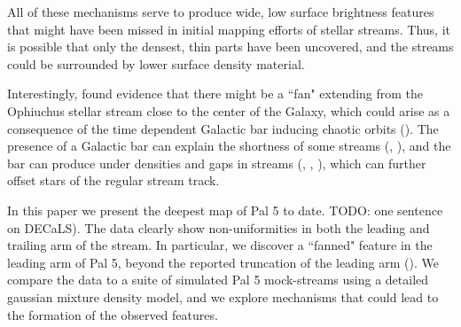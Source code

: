 \documentclass[modern]{aastex62}
\newcommand{\todo}[1]{{\color{red} TODO: #1}}
\begin{document}
All of these mechanisms serve to produce wide, low surface brightness features that might have been missed in initial mapping efforts of stellar streams. Thus, it is possible that only the densest, thin parts have been uncovered, and the streams could be surrounded by lower surface density material. 

Interestingly, \citet{Sesar:2016} found evidence that there might be a ``fan" extending from the Ophiuchus stellar stream close to the center of the Galaxy, which could arise as a consequence of the time dependent Galactic bar inducing chaotic orbits (\citealt{Price-Whelan:2016b}). The presence of a Galactic bar can explain the shortness of some streams (\citealt{Hattori:2016}, \citealt{Pearson:2017}), and the bar can produce under densities and gaps in streams (\citealt{Erkal:2017}, \citealt{Pearson:2017}, \citealt{Banik:2019}), which can further offset stars of the regular stream track.


	
In this paper we present the deepest map of Pal 5 to date. \todo{one sentence on DECaLS)}. The data clearly show non-uniformities in both the leading and trailing arm of the stream. In particular, we discover a ``fanned" feature in the leading arm of Pal 5, beyond the reported truncation of the leading arm (\citealt{Bernard:2016}). We compare the data to a suite of simulated Pal 5 mock-streams using a detailed gaussian mixture density model, and we explore mechanisms that could lead to the formation of the observed features.  
\end{document}
